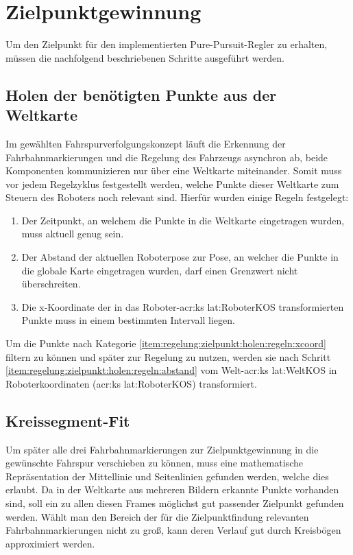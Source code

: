 \section{Zielpunktgewinnung \dcsecondauthorshort}
\label{sec:regelung:zielpunktgewinnung}
Um den Zielpunkt für den implementierten \glqq Pure-Pursuit\grqq -Regler zu erhalten, müssen die nachfolgend beschriebenen Schritte ausgeführt werden.

\subsection{Holen der benötigten Punkte aus der Weltkarte}
\label{ssec:regelung:zielpunkt:holen}
Im gewählten Fahrspurverfolgungskonzept läuft die Erkennung der Fahrbahnmarkierungen und die Regelung des Fahrzeugs asynchron ab, beide Komponenten kommunizieren nur über eine Weltkarte miteinander. Somit muss vor jedem Regelzyklus festgestellt werden, welche Punkte dieser Weltkarte zum Steuern des Roboters noch relevant sind. Hierfür wurden einige Regeln festgelegt:
\begin{enumerate}
\item
Der Zeitpunkt, an welchem die Punkte in die Weltkarte eingetragen wurden, muss aktuell genug sein.
\item \label{item:regelung:zielpunkt:holen:regeln:abstand}
Der Abstand der aktuellen Roboterpose zur Pose, an welcher die Punkte in die globale Karte eingetragen wurden, darf einen Grenzwert nicht überschreiten.
\item \label{item:regelung:zielpunkt:holen:regeln:xcoord}
Die x-Koordinate der in das Roboter-\gls{acr:ks} \gls{lat:RoboterKOS} transformierten Punkte muss in einem bestimmten Intervall liegen.
\end{enumerate}
Um die Punkte nach Kategorie \ref{item:regelung:zielpunkt:holen:regeln:xcoord} filtern zu können und später zur Regelung zu nutzen, werden sie nach Schritt \ref{item:regelung:zielpunkt:holen:regeln:abstand} vom Welt-\gls{acr:ks} \gls{lat:WeltKOS} in Roboterkoordinaten (\gls{acr:ks} \gls{lat:RoboterKOS}) transformiert.

\subsection{Kreissegment-Fit} \label{regelung:zielpunkt:kreissegment-fit}
Um später alle drei Fahrbahnmarkierungen zur Zielpunktgewinnung in die gewünschte Fahrspur verschieben zu können, muss eine mathematische Repräsentation der Mittellinie und Seitenlinien gefunden werden, welche dies erlaubt. Da in der Weltkarte aus mehreren Bildern erkannte Punkte vorhanden sind, soll ein zu allen diesen Frames möglichst gut passender Zielpunkt gefunden werden. Wählt man den Bereich der für die Zielpunktfindung relevanten Fahrbahnmarkierungen nicht zu groß, kann deren Verlauf gut durch Kreisbögen approximiert werden. 

